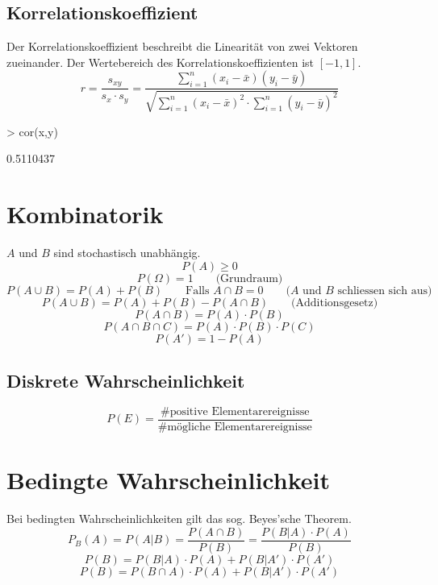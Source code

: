 \subsection{Korrelationskoeffizient}
Der Korrelationskoeffizient beschreibt die Linearität von zwei Vektoren 
zueinander. Der Wertebereich des Korrelationskoeffizienten ist $[-1, 1]$. 
\[ r = \frac{s_{xy}}{s_x \cdot s_y} 
= \frac{\sum\limits_{i=1}^{n} (x_i - \bar{x}) (y_i - \bar{y})}
{\sqrt{\sum\limits_{i=1}^{n} (x_i - \bar{x})^2  \cdot 
\sum\limits_{i=1}^{n} (y_i - \bar{y})^2 }} \]
\begin{Schunk}
\begin{Sinput}
> cor(x,y)
\end{Sinput}
\begin{Soutput}
[1] 0.5110437
\end{Soutput}
\end{Schunk}

\section{Kombinatorik}
$A$ und $B$ sind stochastisch unabhängig. 
\[ P(A) \geq 0 \]
\[ P(\Omega) = 1 \qquad \text{(Grundraum)} \]
\[ P(A \cup B) = P(A) + P(B) \qquad \text{Falls } A \cap B = 0 
\qquad \text{($A$ und $B$ schliessen sich aus)} \]
\[ P(A \cup B) = P(A) + P(B) - P(A \cap B) \qquad \text{(Additionsgesetz)} \]
\[ P(A \cap B) = P(A) \cdot P(B) \]
\[ P(A \cap B \cap C) = P(A) \cdot P(B) \cdot P(C) \]
\[ P(A') = 1 - P(A) \]

\subsection{Diskrete Wahrscheinlichkeit}
\[ P(E) = \frac{\text{\# positive Elementarereignisse}}
{\text{\# mögliche Elementarereignisse}} \]

\newpage
\section{Bedingte Wahrscheinlichkeit}
Bei bedingten Wahrscheinlichkeiten gilt das sog. Beyes'sche Theorem.
\[ \boxed{ P_B(A) = P(A|B) = \frac{P(A \cap B)}{P(B)} = \frac{P(B|A)\cdot P(A)}{P(B)} } \]
\[ \boxed{P(B) = P(B|A) \cdot P(A) + P(B|A') \cdot P(A')} \]
\[ \boxed{P(B) = P(B \cap A) \cdot P(A) + P(B|A') \cdot P(A')} \]

